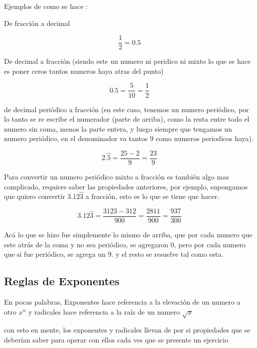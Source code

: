 \documentclass{article}
\begin{document}
		Ejemplos de como se hace : \\
	\begin{center}
		
			De fracción a decimal
	\end{center}
	\begin{equation*}
		\frac{1}{2} = 0.5
	\end{equation*}
	\begin{center}
		De decimal a fracción (siendo este un numero ni peridico ni mixto lo que se hace es poner ceros tantos numeros haya atras del punto)
	\end{center}
	\begin{equation*}
		0.5 = \frac{5}{10} = \frac{1}{2}
	\end{equation*}
	\begin{center}
		de decimal periódico a fracción (en este caso, tenemos un numero periódico, por lo tanto se re escribe el numerador (parte de arriba), como la resta entre todo el numero sin coma, menos la parte entera, y luego siempre que tengamos un numero periódico, en el denominador va tantos 9 como numeros periodicos haya).
	\end{center}
	
	\begin{equation*}
		2.\wideparen{5} = \frac{25 - 2}{9} = \frac{23}{9}
	\end{equation*}
	\begin{center}
		Para convertir un numero periódico mixto a fracción es también algo mas complicado, requiere saber las propiedades anteriores, por ejemplo, supongamos que quiero convertir $3.12\wideparen{3}$ a fracción, esto es lo que se tiene que hacer.
	\end{center}
	 \begin{equation*}
	 	3.12\wideparen{3} = \frac{3123-312}{900} = \frac{2811}{900} = \frac{937}{300}
	 \end{equation*}
	 
	Acá lo que se hizo fue simplemente lo mismo de arriba, que por cada numero que este atrás de la coma y no sea periódico, se agregaron 0, pero por cada numero que si fue periódico, se agrega un 9. y el resto se resuelve tal como esta.
	
	\pagebreak
	\subsection{Reglas de Exponentes}
	\begin{theo}
		En pocas palabras, Exponentes hace referencia a la elevación de un numero a otro $x^n$ y radicales hace referencia a la raíz de un numero $\sqrt{x}$
	\end{theo}
	\hspace{1cm}
	con esto en mente, los exponentes y radicales llevan de por si propiedades que se deberían saber para operar con ellos cada ves que se presente un ejercicio
	
\end{document}
